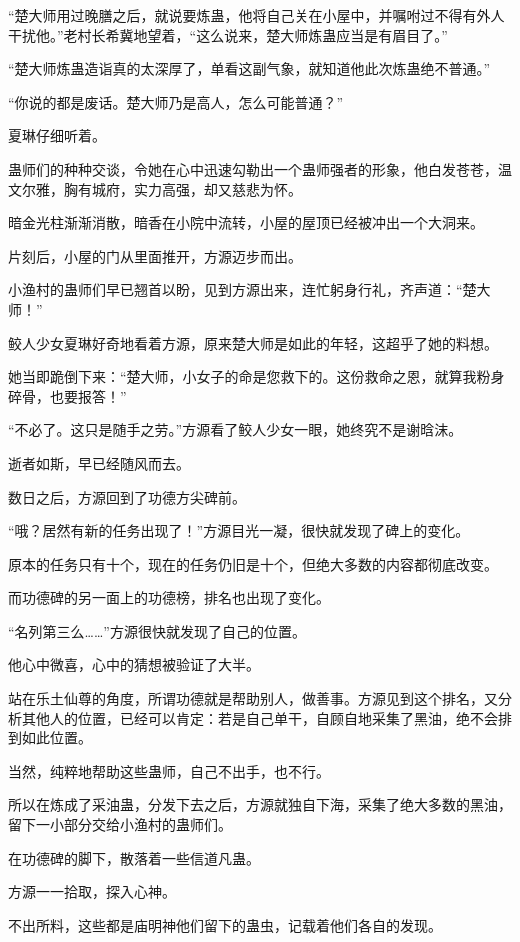 \begin{this_body}
“楚大师用过晚膳之后，就说要炼蛊，他将自己关在小屋中，并嘱咐过不得有外人干扰他。”老村长希冀地望着，“这么说来，楚大师炼蛊应当是有眉目了。”

“楚大师炼蛊造诣真的太深厚了，单看这副气象，就知道他此次炼蛊绝不普通。”

“你说的都是废话。楚大师乃是高人，怎么可能普通？”

夏琳仔细听着。

蛊师们的种种交谈，令她在心中迅速勾勒出一个蛊师强者的形象，他白发苍苍，温文尔雅，胸有城府，实力高强，却又慈悲为怀。

暗金光柱渐渐消散，暗香在小院中流转，小屋的屋顶已经被冲出一个大洞来。

片刻后，小屋的门从里面推开，方源迈步而出。

小渔村的蛊师们早已翘首以盼，见到方源出来，连忙躬身行礼，齐声道：“楚大师！”

鲛人少女夏琳好奇地看着方源，原来楚大师是如此的年轻，这超乎了她的料想。

她当即跪倒下来：“楚大师，小女子的命是您救下的。这份救命之恩，就算我粉身碎骨，也要报答！”

“不必了。这只是随手之劳。”方源看了鲛人少女一眼，她终究不是谢晗沫。

逝者如斯，早已经随风而去。

数日之后，方源回到了功德方尖碑前。

“哦？居然有新的任务出现了！”方源目光一凝，很快就发现了碑上的变化。

原本的任务只有十个，现在的任务仍旧是十个，但绝大多数的内容都彻底改变。

而功德碑的另一面上的功德榜，排名也出现了变化。

“名列第三么……”方源很快就发现了自己的位置。

他心中微喜，心中的猜想被验证了大半。

站在乐土仙尊的角度，所谓功德就是帮助别人，做善事。方源见到这个排名，又分析其他人的位置，已经可以肯定：若是自己单干，自顾自地采集了黑油，绝不会排到如此位置。

当然，纯粹地帮助这些蛊师，自己不出手，也不行。

所以在炼成了采油蛊，分发下去之后，方源就独自下海，采集了绝大多数的黑油，留下一小部分交给小渔村的蛊师们。

在功德碑的脚下，散落着一些信道凡蛊。

方源一一拾取，探入心神。

不出所料，这些都是庙明神他们留下的蛊虫，记载着他们各自的发现。


\end{this_body}

